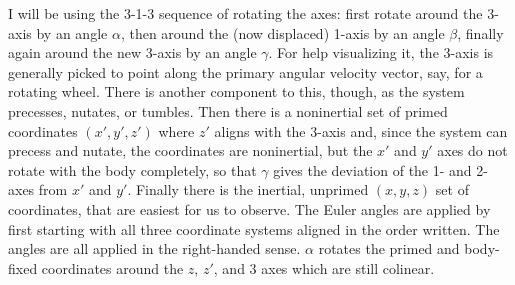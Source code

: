 \documentclass[10pt]{article}
\begin{document}
I will be using the 3-1-3 sequence of rotating the axes: first 
rotate around the 3-axis by an angle $\alpha$, then around the (now 
displaced) 1-axis by an angle $\beta$, finally again around the 
new 3-axis by an angle $\gamma$. For help visualizing it, the 3-axis is 
generally picked to point along the primary angular velocity vector, say, 
for a rotating wheel. There is another component to this, though, as the 
system precesses, nutates, or tumbles. Then there is a noninertial set
of primed coordinates $(x',y',z')$ where $z'$ aligns with the 3-axis and, 
since the system can precess and nutate, the coordinates are noninertial, but 
the $x'$ and $y'$ axes do not rotate with the body completely, 
so that $\gamma$ gives 
the deviation of the 1- and 2-axes from $x'$ and $y'$. Finally there 
is the inertial, unprimed $(x,y,z)$ set of coordinates, that are
easiest for us to observe. The Euler angles are applied by first starting 
with all three coordinate systems aligned in the order written. The angles 
are all applied in the right-handed sense. $\alpha$ 
rotates the primed and body-fixed coordinates around the $z$, $z'$, and $3$
axes which are still colinear. 
\end{document}
